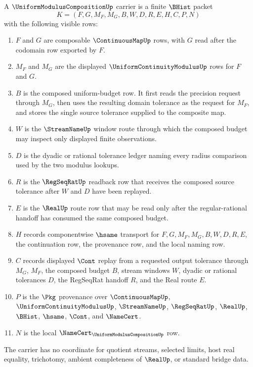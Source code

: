 \begin{definition}
\label{def:uniform-modulus-composition-carrier}
A $\UniformModulusCompositionUp$ carrier is a finite $\BHist$ packet
$$
K=(F,G,M_F,M_G,B,W,D,R,E,H,C,P,N)
$$
with the following visible rows:
\begin{enumerate}
\item $F$ and $G$ are composable $\ContinuousMapUp$ rows, with $G$ read after the codomain row exported by $F$.
\item $M_F$ and $M_G$ are the displayed $\UniformContinuityModulusUp$ rows for $F$ and $G$.
\item $B$ is the composed uniform-budget row. It first reads the precision request through $M_G$, then uses the resulting domain tolerance as the request for $M_F$, and stores the single source tolerance supplied to the composite map.
\item $W$ is the $\StreamNameUp$ window route through which the composed budget may inspect only displayed finite observations.
\item $D$ is the dyadic or rational tolerance ledger naming every radius comparison used by the two modulus lookups.
\item $R$ is the $\RegSeqRatUp$ readback row that receives the composed source tolerance after $W$ and $D$ have been replayed.
\item $E$ is the $\RealUp$ route row that may be read only after the regular-rational handoff has consumed the same composed budget.
\item $H$ records componentwise $\hsame$ transport for $F,G,M_F,M_G,B,W,D,R,E$, the continuation row, the provenance row, and the local naming row.
\item $C$ records displayed $\Cont$ replay from a requested output tolerance through $M_G$, $M_F$, the composed budget $B$, stream windows $W$, dyadic or rational tolerances $D$, the RegSeqRat handoff $R$, and the Real route $E$.
\item $P$ is the $\Pkg$ provenance over $\ContinuousMapUp$, $\UniformContinuityModulusUp$, $\StreamNameUp$, $\RegSeqRatUp$, $\RealUp$, $\BHist$, $\hsame$, $\Cont$, and $\NameCert$.
\item $N$ is the local $\NameCert_{\UniformModulusCompositionUp}$ row.
\end{enumerate}
The carrier has no coordinate for quotient streams, selected limits, host real equality, trichotomy, ambient completeness of $\RealUp$, or standard bridge data.
\end{definition}


